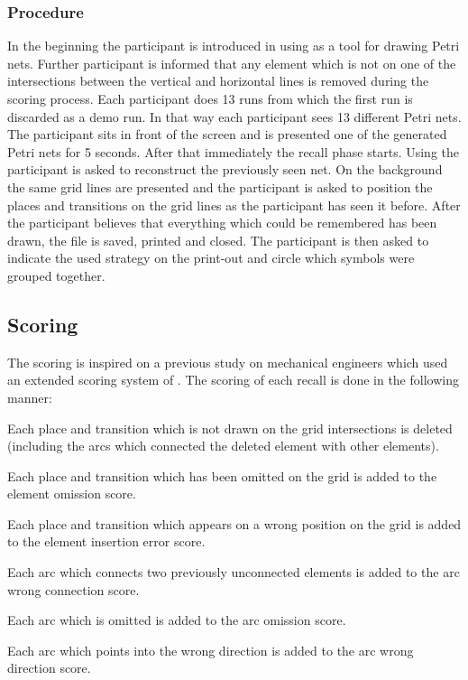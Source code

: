 \subsubsection{Procedure}
In the beginning the participant is introduced in using  \cite{renew} as a tool for drawing Petri nets.
Further participant is informed that any element which is not on one of the intersections between the vertical and horizontal lines is removed during the scoring process.
Each participant does 13 runs from which the first run is discarded as a demo run.
In that way each participant sees 13 different Petri nets.
The participant sits in front of the screen and is presented one of the generated Petri nets for 5 seconds.
After that immediately the recall phase starts.
Using  the participant is asked to reconstruct the previously seen net.
On the background the same grid lines are presented and the participant is asked to position the places and transitions on the grid lines as the participant has seen it before.
After the participant believes that everything which could be remembered has been drawn, the file is saved, printed and closed.
The participant is then asked to indicate the used strategy on the print-out and circle which symbols were grouped together.

\subsection{Scoring}
\label{subsec:scoring}
The scoring is inspired on a previous study on mechanical engineers \cite{moss2006role} which used an extended scoring system of \textcite{chase1973mind}.
The scoring of each recall is done in the following manner:

\begin{APAenumerate}
	\item Each place and transition which is not drawn on the grid intersections is deleted (including the arcs which connected the deleted element with other elements).
	\item  Each place and transition which has been omitted on the grid is added to the element omission score.
	\item Each place and transition which appears on a wrong position on the grid is added to the element insertion error score.
	\item Each arc which connects two previously unconnected elements is added to the arc wrong connection score.
	\item Each arc which is omitted is added to the arc omission score.  
	\item Each arc which points into the wrong direction is added to the arc wrong direction score.
\end{APAenumerate}

